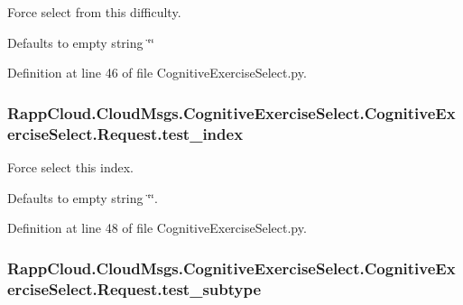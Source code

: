 Force select from this difficulty. 

Defaults to empty string \char`\"{}\char`\"{} 

Definition at line 46 of file Cognitive\-Exercise\-Select.\-py.

\hypertarget{classRappCloud_1_1CloudMsgs_1_1CognitiveExerciseSelect_1_1CognitiveExerciseSelect_1_1Request_addf301147790ec1b4e78ac3d3a5fdcfd}{
\subsubsection[{test\-\_\-index}]{\setlength{\rightskip}{0pt plus 5cm}Rapp\-Cloud.\-Cloud\-Msgs.\-Cognitive\-Exercise\-Select.\-Cognitive\-Exercise\-Select.\-Request.\-test\-\_\-index}}\label{classRappCloud_1_1CloudMsgs_1_1CognitiveExerciseSelect_1_1CognitiveExerciseSelect_1_1Request_addf301147790ec1b4e78ac3d3a5fdcfd}


Force select this index. 

Defaults to empty string \char`\"{}\char`\"{}. 

Definition at line 48 of file Cognitive\-Exercise\-Select.\-py.

\hypertarget{classRappCloud_1_1CloudMsgs_1_1CognitiveExerciseSelect_1_1CognitiveExerciseSelect_1_1Request_a6cc6c7d54269fb24d6641ed85871ff72}{
\subsubsection[{test\-\_\-subtype}]{\setlength{\rightskip}{0pt plus 5cm}Rapp\-Cloud.\-Cloud\-Msgs.\-Cognitive\-Exercise\-Select.\-Cognitive\-Exercise\-Select.\-Request.\-test\-\_\-subtype}}\label{classRappCloud_1_1CloudMsgs_1_1CognitiveExerciseSelect_1_1CognitiveExerciseSelect_1_1Request_a6cc6c7d54269fb24d6641ed85871ff72}


